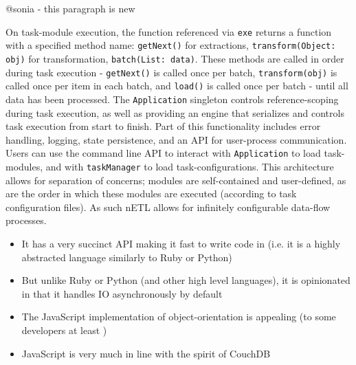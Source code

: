 @sonia - this paragraph is new

On task-module execution, the function referenced via \texttt{exe} returns a function with a specified method name: \texttt{getNext()} for extractions, \texttt{transform(Object: obj)} for transformation, \texttt{batch(List: data)}. These methods are called in order during task execution - \texttt{getNext()} is called once per batch, \texttt{transform(obj)} is called once per item in each batch, and \texttt{load()} is called once per batch - until all data has been processed. The \texttt{Application} singleton controls reference-scoping during task execution, as well as providing an engine that serializes and controls task execution from start to finish. Part of this functionality includes error handling, logging, state persistence, and an API for user-process communication. Users can use the command line API to interact with \texttt{Application} to load task-modules, and with \texttt{taskManager} to load task-configurations. This architecture allows for separation of concerns; modules are self-contained and user-defined, as are the order in which these modules are executed (according to task configuration files). As such nETL allows for infinitely configurable data-flow processes.

\begin{itemize}
    \item It has a very succinct API making it fast to write code in (i.e. it is a highly abstracted language similarly to Ruby or Python)
    \item But unlike Ruby or Python (and other high level languages), it is opinionated in that it handles IO asynchronously by default
    \item The JavaScript implementation of object-orientation is appealing (to some developers at least \cite{jsBook})
    \item JavaScript is very much in line with the spirit of CouchDB
\end{itemize}